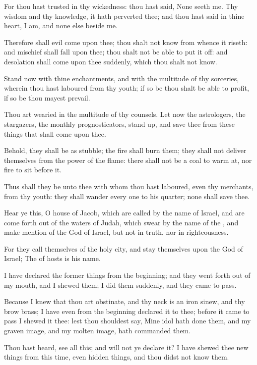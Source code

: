 \Verse For thou hast trusted in thy wickedness: thou hast said, None seeth me. Thy wisdom and thy knowledge, it hath perverted thee; and thou hast said in thine heart, I am, and none else beside me.

\Verse Therefore shall evil come upon thee; thou shalt not know from whence it riseth: and mischief shall fall upon thee; thou shalt not be able to put it off: and desolation shall come upon thee suddenly, which thou shalt not know.

\Verse Stand now with thine enchantments, and with the multitude of thy sorceries, wherein thou hast laboured from thy youth; if so be thou shalt be able to profit, if so be thou mayest prevail.

\Verse Thou art wearied in the multitude of thy counsels. Let now the astrologers, the stargazers, the monthly prognosticators, stand up, and save thee from these things that shall come upon thee.

\Verse Behold, they shall be as stubble; the fire shall burn them; they shall not deliver themselves from the power of the flame: there shall not be a coal to warm at, nor fire to sit before it.

\Verse Thus shall they be unto thee with whom thou hast laboured, even thy merchants, from thy youth: they shall wander every one to his quarter; none shall save thee.


\Chapter
\Verse Hear ye this, O house of Jacob, which are called by the name of Israel, and are come forth out of the waters of Judah, which swear by the name of the \LORD, and make mention of the God of Israel, but not in truth, nor in righteousness.

\Verse For they call themselves of the holy city, and stay themselves upon the God of Israel; The \LORD of hosts is his name.

\Verse I have declared the former things from the beginning; and they went forth out of my mouth, and I shewed them; I did them suddenly, and they came to pass.

\Verse Because I knew that thou art obstinate, and thy neck is an iron sinew, and thy brow brass; \Verse I have even from the beginning declared it to thee; before it came to pass I shewed it thee: lest thou shouldest say, Mine idol hath done them, and my graven image, and my molten image, hath commanded them.

\Verse Thou hast heard, see all this; and will not ye declare it? I have shewed thee new things from this time, even hidden things, and thou didst not know them.

